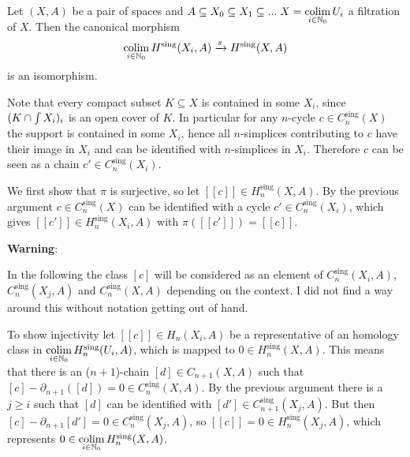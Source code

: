 	\begin{proposition}
		Let $(X,A)$ be a pair of spaces and $A \subseteq X_0 \subseteq X_1 \subseteq ... \;X = \smash{\operatorname*{colim} \limits_{i\in \mathbb{N}_0}U_i}$ a filtration of $X$. Then the canonical morphism
		\begin{equation*}
			\operatorname*{colim} \limits_{i \in \mathbb{N}_0} H^\text{sing}(X_i,A) \xrightarrow{\pi} H^\text{sing}(X,A)
		\end{equation*}
		is an isomorphism.
	\end{proposition}
	\begin{sketch}
		Note that every compact subset $K \subseteq X$ is contained in some $X_i$, since $(K \cap \int X_i)_i$ is an open cover of $K$. In particular for any $n$-cycle $c \in C_n^\text{sing}(X)$ the support is contained in some $X_i$, hence all $n$-simplices contributing to $c$ have their image in $X_i$ and can be identified with $n$-simplices in $X_i$. Therefore $c$ can be seen as a chain $c' \in C_n^\text{sing}(X_i)$.

		We first show that $\pi$ is surjective, so let $[[c]] \in H_n^\text{sing}(X,A)$. By the previous argument $c \in C_n^\text{sing}(X)$ can be identified with a cycle $c' \in C_n^\text{sing}(X_i)$, which gives $[[c']] \in H_n^\text{sing}(X_i,A)$ with $\pi([[c']]) = [[c]].$

		\textbf{Warning}: 
		\vspace{-1.8em}
		\begin{tab}[2cm]
			In the following the class $[c]$ will be considered as an element of $C_n^\text{sing}(X_i,A)$, $C_n^\text{sing}(X_j,A)$ and $C_n^\text{sing}(X,A)$ depending on the context. I did not find a way around this without notation getting out of hand.
		\end{tab}

		To show injectivity let $[[c]] \in H_n(X_i,A)$ be a representative of an homology class in $\operatorname*{colim} \limits_{i \in \mathbb{N}_0} H_n^\text{sing}(U_i,A)$, which is mapped to $0 \in H_n^\text{sing}(X,A)$. This means that there is an ($n+1$)-chain $[d] \in C_{n+1}(X,A)$ such that $[c] - \partial_{n+1}([d]) = 0 \in C_n^\text{sing}(X,A)$. By the previous argument there is a $j \geq i$ such that $[d]$ can be identified with $[d'] \in C_{n+1}^\text{sing}(X_j,A)$. But then $[c]-\partial_{n+1}[d'] = 0 \in C_n^\text{sing}(X_j,A)$, so $[[c]] = 0 \in H_n^\text{sing}(X_j,A)$, which represents $0 \in \operatorname*{colim} \limits_{i \in \mathbb{N}_0} H_n^\text{sing}(X,A)$.
	\end{sketch}


